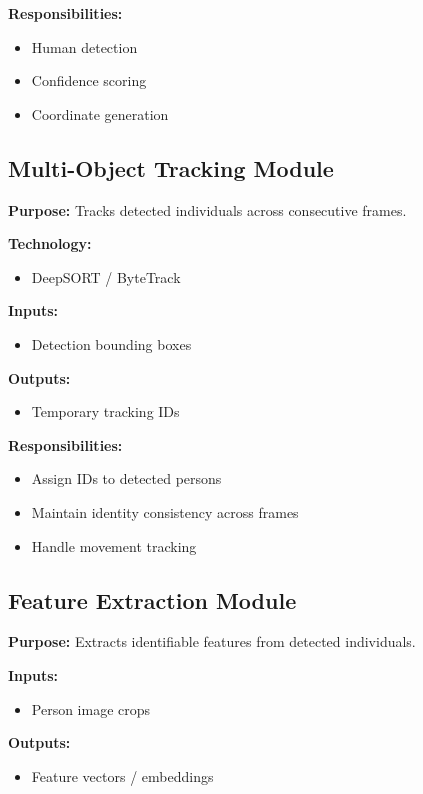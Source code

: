\documentclass[12pt,a4paper]{article}
\begin{document}
\textbf{Responsibilities:}
\begin{itemize}
    \item Human detection
    \item Confidence scoring
    \item Coordinate generation
\end{itemize}

\subsection{Multi-Object Tracking Module}

\textbf{Purpose:}
Tracks detected individuals across consecutive frames.

\textbf{Technology:}
\begin{itemize}
    \item DeepSORT / ByteTrack
\end{itemize}

\textbf{Inputs:}
\begin{itemize}
    \item Detection bounding boxes
\end{itemize}

\textbf{Outputs:}
\begin{itemize}
    \item Temporary tracking IDs
\end{itemize}

\textbf{Responsibilities:}
\begin{itemize}
    \item Assign IDs to detected persons
    \item Maintain identity consistency across frames
    \item Handle movement tracking
\end{itemize}

\subsection{Feature Extraction Module}

\textbf{Purpose:}
Extracts identifiable features from detected individuals.

\textbf{Inputs:}
\begin{itemize}
    \item Person image crops
\end{itemize}

\textbf{Outputs:}
\begin{itemize}
    \item Feature vectors / embeddings
\end{itemize}
\end{document}
